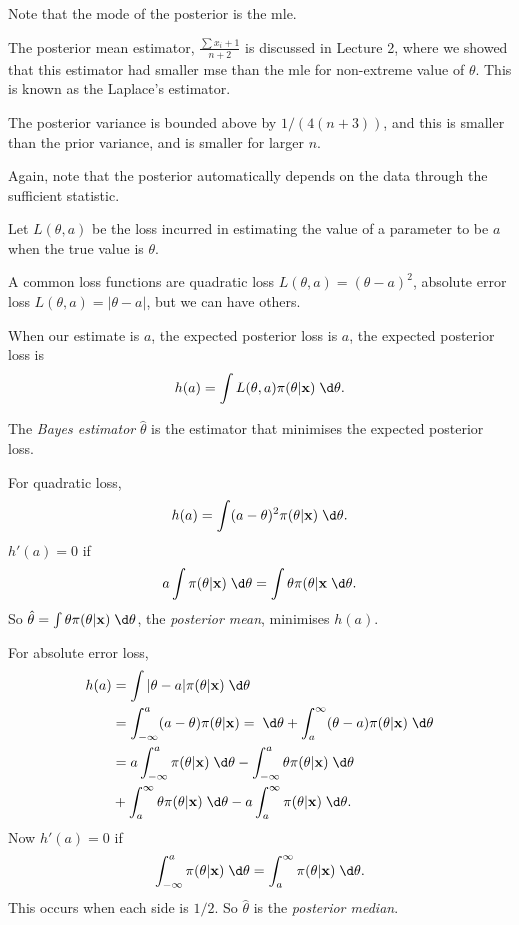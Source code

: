 \documentclass[a4paper]{article}
\begin{document}
Note that the mode of the posterior is the mle.

The posterior mean estimator, $\frac{\sum x_i + 1}{n + 2}$ is discussed in Lecture 2, where we showed that this estimator had smaller mse than the mle for non-extreme value of $\theta$. This is known as the Laplace's estimator.

The posterior variance is bounded above by $1/(4(n + 3))$, and this is smaller than the prior variance, and is smaller for larger $n$.

Again, note that the posterior automatically depends on the data through the sufficient statistic.

Let $L(\theta, a)$ be the loss incurred in estimating the value of a parameter to be $a$ when the true value is $\theta$.

A common loss functions are quadratic loss $L(\theta, a) = (\theta - a)^2$, absolute error loss $L(\theta, a) = |\theta - a|$, but we can have others.

When our estimate is $a$, the expected posterior loss is $a$, the expected posterior loss is
\[
  h(a) = \int L(\theta, a)\pi(\theta|\mathbf{x})\;\d \theta.
\]
\begin{defi}
  The \emph{Bayes estimator} $\hat{\theta}$ is the estimator that minimises the expected posterior loss.
\end{defi}

For quadratic loss,
\[
  h(a) = \int (a - \theta)^2 \pi(\theta|\mathbf{x})\;\d \theta.
\]
$h'(a) = 0$ if
\[
  a\int \pi (\theta|\mathbf{x})\;\d \theta = \int \theta \pi(\theta|\mathbf{x}\;\d \theta.
\]
So $\hat{\theta} = \int \theta\pi(\theta|\mathbf{x})\;\d \theta$, the \emph{posterior mean}, minimises $h(a)$.

For absolute error loss,
\begin{align*}
  h(a) &= \int |\theta - a|\pi(\theta|\mathbf{x})\;\d \theta\\
  &= \int_{-\infty}^a (a - \theta)\pi(\theta|\mathbf{x}) = \;\d \theta + \int_a^\infty (\theta - a)\pi(\theta|\mathbf{x})\;\d \theta\\
  &= a\int_{-\infty}^a \pi(\theta|\mathbf{x})\;\d \theta - \int_{-\infty}^a\theta\pi(\theta|\mathbf{x})\;\d \theta\\
  &+ \int_a^\infty \theta\pi(\theta|\mathbf{x})\;\d \theta - a\int_a^\infty \pi(\theta|\mathbf{x})\;\d \theta.
\end{align*}
Now $h'(a) = 0$ if
\[
  \int_{-\infty}^a \pi(\theta|\mathbf{x})\;\d \theta = \int_a^\infty \pi(\theta|\mathbf{x})\;\d \theta.
\]
This occurs when each side is $1/2$. So $\hat{\theta}$ is the \emph{posterior median}.
\end{document}
